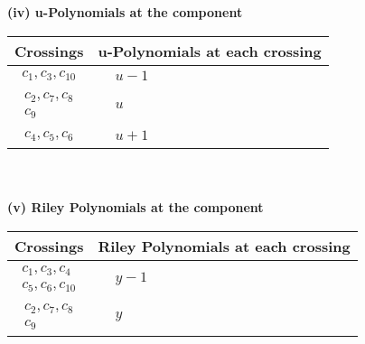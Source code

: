 \documentclass[1p]{elsarticle_modified}
\theoremstyle{definition}
\begin{document}
\flushleft \textbf{(iv) u-Polynomials at the component}\newline \\
\begin{tabular}{m{50pt}|m{274pt}}
Crossings & \hspace{64pt}u-Polynomials at each crossing \\
\hline $$\begin{aligned}c_{1},c_{3},c_{10}\end{aligned}$$&$\begin{aligned}
&u-1
\end{aligned}$\\
\hline $$\begin{aligned}c_{2},c_{7},c_{8}\\c_{9}\end{aligned}$$&$\begin{aligned}
&u
\end{aligned}$\\
\hline $$\begin{aligned}c_{4},c_{5},c_{6}\end{aligned}$$&$\begin{aligned}
&u+1
\end{aligned}$\\
\hline
\end{tabular}\\~\\
\newpage\renewcommand{\arraystretch}{1}
\flushleft \textbf{(v) Riley Polynomials at the component}\newline \\
\begin{tabular}{m{50pt}|m{274pt}}
Crossings & \hspace{64pt}Riley Polynomials at each crossing \\
\hline $$\begin{aligned}c_{1},c_{3},c_{4}\\c_{5},c_{6},c_{10}\end{aligned}$$&$\begin{aligned}
&y-1
\end{aligned}$\\
\hline $$\begin{aligned}c_{2},c_{7},c_{8}\\c_{9}\end{aligned}$$&$\begin{aligned}
&y
\end{aligned}$\\
\hline
\end{tabular}\\~\\
\end{document}
